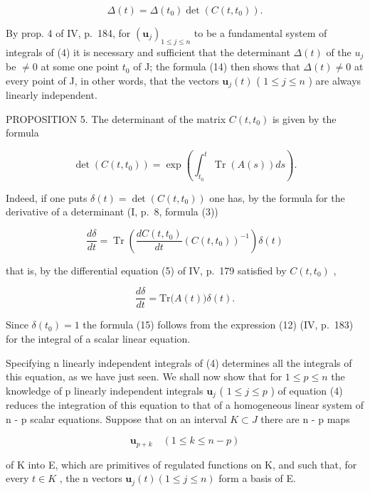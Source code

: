 \[
\Delta (t) = \Delta (t _ {0}) \det \left(C (t, t _ {0})\right).\tag{14}
\]

By prop. 4 of IV, p.~184, for \(\left(\mathbf{u}_{j}\right)_{1\leqslant j\leqslant n}\) to be a fundamental system of integrals of (4) it is necessary and sufficient that the determinant \(\Delta(t)\) of the \(u_{j}\) be \(\neq0\) at some one point \(t_{0}\) of J; the formula (14) then shows that \(\Delta(t)\neq0\) at every point of J, in other words, that the vectors \(\mathbf{u}_{j}(t)\) ( \(1\leqslant j\leqslant n\) ) are always linearly independent.

PROPOSITION 5. The determinant of the matrix \(C(t, t_{0})\) is given by the formula

\[
\det \left(C (t, t _ {0})\right) = \exp \left(\int_ {t _ {0}} ^ {t} \operatorname{Tr} (A (s)) d s\right).\tag{15}
\]

Indeed, if one puts \(\delta(t) = \det\left(C(t, t_0)\right)\) one has, by the formula for the derivative of a determinant (I, p.~8, formula (3))

\[
\frac {d \delta}{d t} = \operatorname{Tr} \left(\frac {d C (t , t _ {0})}{d t} \left(C (t, t _ {0})\right) ^ {- 1}\right) \delta (t)
\]

that is, by the differential equation (5) of IV, p.~179 satisfied by \(C(t, t_0)\) ,

\[
\frac {d \delta}{d t} = \mathrm{Tr} \big (A (t) \big) \delta (t).
\]

Since \(\delta(t_0) = 1\) the formula (15) follows from the expression (12) (IV, p.~183) for the integral of a scalar linear equation.

Specifying n linearly independent integrals of (4) determines all the integrals of this equation, as we have just seen. We shall now show that for \(1 \leqslant p \leqslant n\) the knowledge of p linearly independent integrals \(\mathbf{u}_{j}\) ( \(1 \leqslant j \leqslant p\) ) of equation (4) reduces the integration of this equation to that of a homogeneous linear system of n - p scalar equations. Suppose that on an interval \(K \subset J\) there are n - p maps

\[
\mathbf {u} _ {p + k} \quad (1 \leqslant k \leqslant n - p)
\]

of K into E, which are primitives of regulated functions on K, and such that, for every \(t \in K\) , the n vectors \(\mathbf{u}_{j}(t) (1 \leqslant j \leqslant n)\) form a basis of E.

